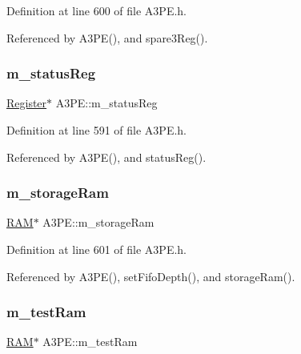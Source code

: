 Definition at line 600 of file A3\+P\+E.\+h.



Referenced by A3\+P\+E(), and spare3\+Reg().

\mbox{\label{classA3PE_a2281e3d12a2dffad99ec55be2b695f53}} 
\subsubsection{\texorpdfstring{m\+\_\+status\+Reg}{m\_statusReg}}
{\footnotesize\ttfamily \hyperlink{classRegister}{Register}$\ast$ A3\+P\+E\+::m\+\_\+status\+Reg\hspace{0.3cm}{\ttfamily [private]}}



Definition at line 591 of file A3\+P\+E.\+h.



Referenced by A3\+P\+E(), and status\+Reg().

\mbox{\label{classA3PE_a41e317474e0c6e63bad4648903279be9}} 
\subsubsection{\texorpdfstring{m\+\_\+storage\+Ram}{m\_storageRam}}
{\footnotesize\ttfamily \hyperlink{classRAM}{R\+AM}$\ast$ A3\+P\+E\+::m\+\_\+storage\+Ram\hspace{0.3cm}{\ttfamily [private]}}



Definition at line 601 of file A3\+P\+E.\+h.



Referenced by A3\+P\+E(), set\+Fifo\+Depth(), and storage\+Ram().

\mbox{\label{classA3PE_ad788e41ef5c674ab1a7671f3db0ffef6}} 
\subsubsection{\texorpdfstring{m\+\_\+test\+Ram}{m\_testRam}}
{\footnotesize\ttfamily \hyperlink{classRAM}{R\+AM}$\ast$ A3\+P\+E\+::m\+\_\+test\+Ram\hspace{0.3cm}{\ttfamily [private]}}



